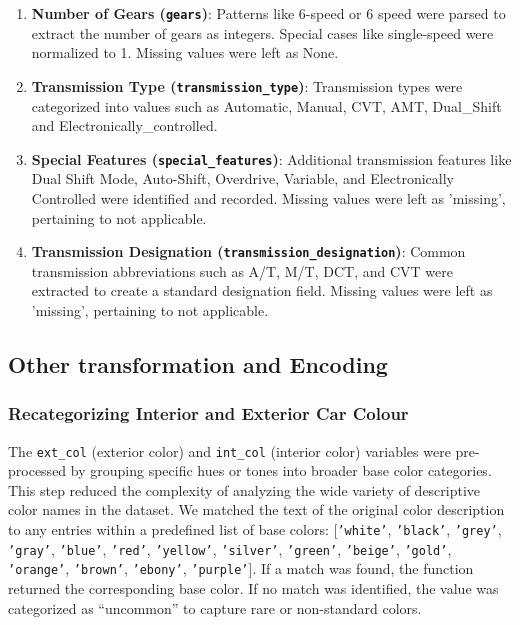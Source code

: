 \documentclass{article}
\begin{document}
\begin{enumerate}
   \item \textbf{Number of Gears (\texttt{gears})}: Patterns like 6-speed or 6 speed were parsed to extract the number of gears as integers. Special cases like single-speed were normalized to 1. Missing values were left as None.
   
   \item \textbf{Transmission Type (\texttt{transmission\_type})}: Transmission types were categorized into values such as Automatic, Manual, CVT, AMT, Dual\_Shift and Electronically\_controlled.
   
   \item \textbf{Special Features (\texttt{special\_features})}: Additional transmission features like Dual Shift Mode, Auto-Shift, Overdrive, Variable, and Electronically Controlled were identified and recorded. Missing values were left as 'missing', pertaining to not applicable.
   
   \item \textbf{Transmission Designation (\texttt{transmission\_designation})}: Common transmission abbreviations such as A/T, M/T, DCT, and CVT were extracted to create a standard designation field. Missing values were left as 'missing', pertaining to not applicable.
\end{enumerate}

\subsection{Other transformation and Encoding}
\subsubsection{Recategorizing Interior and Exterior Car Colour}
The \texttt{ext\_col} (exterior color) and \texttt{int\_col} (interior color) variables were pre-processed by grouping specific hues or tones into broader base color categories. This step reduced the complexity of analyzing the wide variety of descriptive color names in the dataset. We matched the text of the original color description to any entries within a predefined list of base colors: [\texttt{'white'}, \texttt{'black'}, \texttt{'grey'}, \texttt{'gray'}, \texttt{'blue'}, \texttt{'red'}, \texttt{'yellow'}, \texttt{'silver'}, \texttt{'green'}, \texttt{'beige'}, \texttt{'gold'}, \texttt{'orange'}, \texttt{'brown'}, \texttt{'ebony'}, \texttt{'purple'}]. If a match was found, the function returned the corresponding base color. If no match was identified, the value was categorized as ``uncommon'' to capture rare or non-standard colors.
\end{document}
